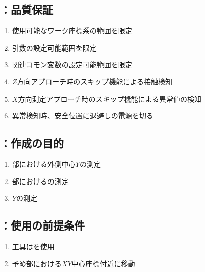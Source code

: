 \subsection{\MXOThickness：品質保証}
\begin{enumerate}[label*=\sarrow]
\item 使用可能なワーク座標系の範囲を限定
\item {}引数の設定可能範囲を限定
\item 関連コモン変数の設定可能範囲を限定
\item $Z$方向アプローチ時のスキップ機能による接触検知
\item $X$方向測定アプローチ時のスキップ機能による異常値の検知
\item 異常検知時、安全位置に退避し\TouchSensorProbe の電源を切る
\end{enumerate}



\clearpage


\subsection{\MYOThickness：作成の目的}
\begin{enumerate}[label*=\sarrow]
\item \EndFace 部における外側中心$Y$の測定
\item \EndFace 部における\BDOD の測定
\item \KeywayCenter$Y$の測定
\end{enumerate}


\subsection{\MYOThickness：使用の前提条件}
\begin{enumerate}[label*=\sarrow]
\item 工具は\TouchSensorProbe を使用
\item 予め\EndFace 部における$XY$中心座標付近に移動
\end{enumerate}


